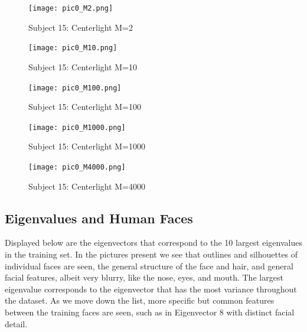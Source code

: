 \documentclass{article}
\begin{document}
\begin{figure}[!htb]
   \begin{minipage}{0.48\textwidth}
     \centering
      \texttt{[image: pic0\_M2.png]}
    \caption{Subject 15: Centerlight M=2}
   \end{minipage}\hfill
   \begin{minipage}{0.48\textwidth}
     \centering
     \texttt{[image: pic0\_M10.png]}
     \caption{Subject 15: Centerlight M=10}
   \end{minipage}
   \begin{minipage}{0.48\textwidth}
     \centering
     \texttt{[image: pic0\_M100.png]}
     \caption{Subject 15: Centerlight M=100}
   \end{minipage}
   \begin{minipage}{0.48\textwidth}
     \centering
     \texttt{[image: pic0\_M1000.png]}
     \caption{Subject 15: Centerlight M=1000}
   \end{minipage}
   \begin{minipage}{0.48\textwidth}
     \centering
     \texttt{[image: pic0\_M4000.png]}
     \caption{Subject 15: Centerlight M=4000}
   \end{minipage}
\end{figure}

\subsection{Eigenvalues and Human Faces}

Displayed below are the eigenvectors that correspond to the 10 largest eigenvalues in the training set. In the pictures present we see that outlines and silhouettes of individual faces are seen, the general structure of the face and hair, and general facial features, albeit very blurry, like the nose, eyes, and mouth. The largest eigenvalue corresponds to the eigenvector that has the most variance throughout the dataset. As we move down the list, more specific but common features between the training faces are seen, such as in Eigenvector 8 with distinct facial detail.
\end{document}
